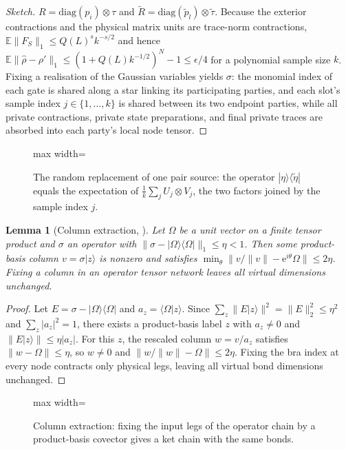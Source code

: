 \documentclass[aps,prx,reprint,superscriptaddress,floatfix,nofootinbib,longbibliography,amsmath,amssymb]{revtex4-2}
\newcommand{\E}{\mathbb E}
\newcommand{\norm}[1]{\lVert #1\rVert}
\newcommand{\abs}[1]{\lvert #1\rvert}
\providecommand{\ket}[1]{|#1\rangle}\renewcommand{\ket}[1]{|#1\rangle}
\providecommand{\bra}[1]{\langle #1|}\renewcommand{\bra}[1]{\langle #1|}
\newcommand{\Om}{\Omega}
\newcommand{\e}{\mathrm e}
\theoremstyle{plain}
\newtheorem{lemma}[theorem]{Lemma}
\theoremstyle{definition}
\begin{document}
\begin{proof}[Sketch]
$R=\mathrm{diag}(p_i)\otimes\tau$ and $\widetilde R=\mathrm{diag}(\tilde p_l)\otimes\tilde\tau$.
Because the exterior contractions and the physical matrix units are trace-norm contractions,
$\E\norm{F_S}_1\le Q(L)^sk^{-s/2}$ and hence
$\E\norm{\widehat\rho-\rho'}_1\le(1+Q(L)k^{-1/2})^N-1\le\epsilon/4$ for a
polynomial sample size $k$. Fixing a realisation of the Gaussian variables yields $\sigma$: the monomial
index of each gate is shared along a star linking its participating parties, and each
slot's sample index $j\in\{1,\dots,k\}$ is shared between its two endpoint parties, while all private
contractions, private state preparations, and final private traces are
absorbed into each party's local node tensor.
\end{proof}

\begin{figure}[t]
\centering
\begin{adjustbox}{max width=\linewidth}

\end{adjustbox}
\caption{The random replacement of one pair source: the operator $\ket\eta\bra{\tilde\eta}$ equals the expectation of $\frac1k\sum_j U_j\otimes V_j$, the two factors joined by the sample index $j$.}\label{fig:source-sampling}
\end{figure}

\begin{lemma}[Column extraction, {\cite[Lemma~8.1]{PP}}]\label{lem:column}
Let $\Om$ be a unit vector on a finite tensor product and $\sigma$ an
operator with $\norm{\sigma-\ket\Om\bra\Om}_1\le\eta<1$. Then some
product-basis column $v=\sigma\ket z$ is nonzero and satisfies
$\min_\theta\norm{v/\norm v-\e^{i\theta}\Om}\le2\eta$. Fixing a column in an
operator tensor network leaves all virtual dimensions unchanged.
\end{lemma}
\begin{proof}
Let $E=\sigma-\ket\Om\bra\Om$ and $a_z=\langle\Om|z\rangle$. Since
$\sum_z\norm{E\ket z}^2=\norm E_2^2\le\eta^2$ and $\sum_z\abs{a_z}^2=1$,
there exists a product-basis label $z$ with $a_z\ne0$ and $\norm{E\ket z}\le\eta\abs{a_z}$. For this $z$,
the rescaled column $w=v/a_z$ satisfies $\norm{w-\Om}\le\eta$, so $w\ne0$ and
$\norm{w/\norm w-\Om}\le2\eta$. Fixing the bra index at every node contracts
only physical legs, leaving all virtual bond dimensions unchanged.
\end{proof}

\begin{figure}[t]
\centering
\begin{adjustbox}{max width=\linewidth}

\end{adjustbox}
\caption{Column extraction: fixing the input legs of the operator chain by a product-basis covector gives a ket chain with the same bonds.}\label{fig:column}
\end{figure}
\end{document}
